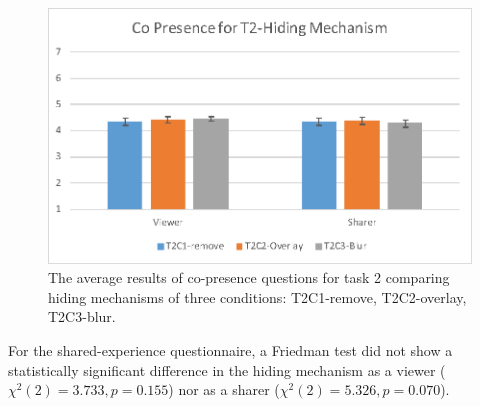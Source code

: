 \begin{figure}
    \begin{center}
    \includegraphics[width=.8\linewidth]{images/54-hiding-frontier18/images-11.eps}
    \caption{The average results of co-presence questions for task 2 comparing hiding mechanisms of three conditions: T2C1-remove, T2C2-overlay, T2C3-blur.}
    \label{fig:frontier18:result-copresence-hiding}
    \end{center}
\end{figure}

For the shared-experience questionnaire, a Friedman test did not show a statistically significant difference in the hiding mechanism as a viewer ($\chi^2(2)=3.733, p=0.155$) nor as a sharer ($\chi^2(2)=5.326, p=0.070$).


